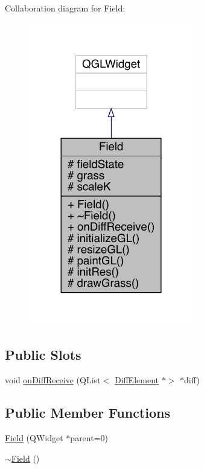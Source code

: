 Collaboration diagram for Field\+:
\nopagebreak
\begin{figure}[H]
\begin{center}
\leavevmode
\includegraphics[width=204pt]{d1/d0d/a00171}
\end{center}
\end{figure}
\subsection*{Public Slots}
\begin{DoxyCompactItemize}
\item 
void \hyperlink{a00173_a407d6701413d3627ef50e9e86786b987}{on\+Diff\+Receive} (Q\+List$<$ \hyperlink{a00141}{Diff\+Element} $\ast$$>$ $\ast$diff)
\end{DoxyCompactItemize}
\subsection*{Public Member Functions}
\begin{DoxyCompactItemize}
\item 
\hyperlink{a00173_ab3e028578ffc9df6d7d12dbbc83be19f}{Field} (Q\+Widget $\ast$parent=0)
\item 
\hyperlink{a00173_a45d6e6d09b8f8e46de62b40119d62c60}{$\sim$\+Field} ()
\end{DoxyCompactItemize}

